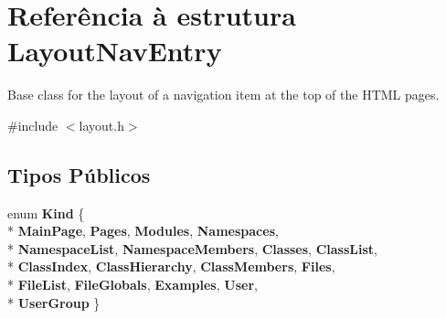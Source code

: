 \hypertarget{struct_layout_nav_entry}{\section{Referência à estrutura Layout\-Nav\-Entry}
\label{struct_layout_nav_entry}
}


Base class for the layout of a navigation item at the top of the H\-T\-M\-L pages.  




{\ttfamily \#include $<$layout.\-h$>$}

\subsection*{Tipos Públicos}
\begin{DoxyCompactItemize}
\item 
enum {\bfseries Kind} \{ \\*
{\bfseries Main\-Page}, 
{\bfseries Pages}, 
{\bfseries Modules}, 
{\bfseries Namespaces}, 
\\*
{\bfseries Namespace\-List}, 
{\bfseries Namespace\-Members}, 
{\bfseries Classes}, 
{\bfseries Class\-List}, 
\\*
{\bfseries Class\-Index}, 
{\bfseries Class\-Hierarchy}, 
{\bfseries Class\-Members}, 
{\bfseries Files}, 
\\*
{\bfseries File\-List}, 
{\bfseries File\-Globals}, 
{\bfseries Examples}, 
{\bfseries User}, 
\\*
{\bfseries User\-Group}
 \}
\end{DoxyCompactItemize}
